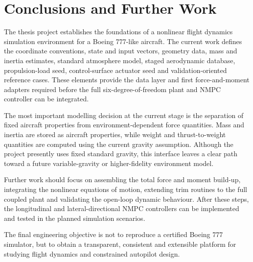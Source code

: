 \chapter{Conclusions and Further Work}

The thesis project establishes the foundations of a nonlinear flight dynamics simulation environment for a Boeing 777-like aircraft. The current work defines the coordinate conventions, state and input vectors, geometry data, mass and inertia estimates, standard atmosphere model, staged aerodynamic database, propulsion-load seed, control-surface actuator seed and validation-oriented reference cases. These elements provide the data layer and first force-and-moment adapters required before the full six-degree-of-freedom plant and NMPC controller can be integrated.

The most important modelling decision at the current stage is the separation of fixed aircraft properties from environment-dependent force quantities. Mass and inertia are stored as aircraft properties, while weight and thrust-to-weight quantities are computed using the current gravity assumption. Although the project presently uses fixed standard gravity, this interface leaves a clear path toward a future variable-gravity or higher-fidelity environment model.

Further work should focus on assembling the total force and moment build-up, integrating the nonlinear equations of motion, extending trim routines to the full coupled plant and validating the open-loop dynamic behaviour. After these steps, the longitudinal and lateral-directional NMPC controllers can be implemented and tested in the planned simulation scenarios.

The final engineering objective is not to reproduce a certified Boeing 777 simulator, but to obtain a transparent, consistent and extensible platform for studying flight dynamics and constrained autopilot design.
